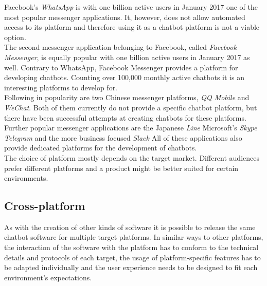 Facebook's \emph{WhatsApp} is with one billion active users in January 2017\cite{fbpopular} one of the most popular messenger applications. It, however, does not allow automated access to its platform and therefore using it as a chatbot platform is not a viable option.
\\

The second messenger application belonging to Facebook, called \emph{Facebook Messenger}, is equally popular with one billion active users in January 2017\cite{fbpopular} as well. Contrary to WhatsApp, Facebook Messenger provides a platform for developing chatbots. Counting over 100,000 monthly active chatbots\cite{messenger} it is an interesting platforms to develop for.
\\

Following in popularity\cite{appusage} are two Chinese messenger platforms, \emph{QQ Mobile} and \emph{WeChat}. Both of them currently do not provide a specific chatbot platform, but there have been successful attempts at creating chatbots for these platforms\cite{wechatbot}.
\\

Further popular messenger applications are the Japanese \emph{Line} Microsoft's \emph{Skype} \emph{Telegram} and the more business focused \emph{Slack} All of these applications also provide dedicated platforms for the development of chatbots.
\\

The choice of platform mostly depends on the target market. Different audiences prefer different platforms and a product might be better suited for certain environments.


\subsection{Cross-platform}

As with the creation of other kinds of software it is possible to release the same chatbot software for multiple target platforms. In similar ways to other platforms, the interaction of the software with the platform has to conform to the technical details and protocols of each target, the usage of platform-specific features has to be adapted individually and the user experience needs to be designed to fit each environment's expectations.
\\

